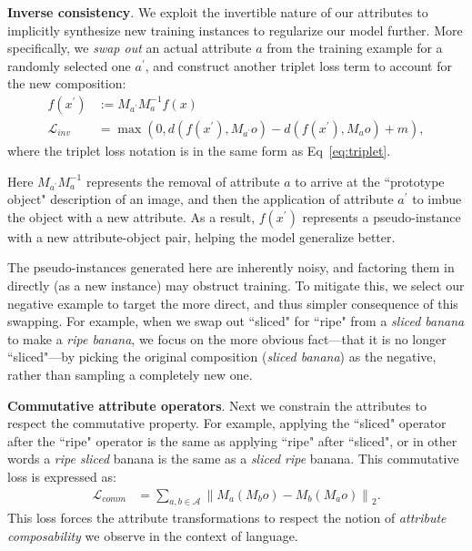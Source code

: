 \documentclass[runningheads]{llncs}
\begin{document}
\vspace{0.05in}
\noindent\textbf{Inverse consistency}.
We exploit the invertible nature of our attributes to implicitly synthesize new training instances to regularize our model further. More specifically, we \emph{swap out} an actual attribute $a$ from the training example for a randomly selected one $a^\prime$, and construct another triplet loss term to account for the new composition:
\begin{equation}
\begin{split}
f(x^\prime) & := M_{a^\prime}M_a^{-1}f(x) \\
\mathcal{L}_{inv} &= \max\left ( 0, d(f(x^\prime), M_{a^\prime}o) - d(f(x^\prime), M_{a}o) + m\right ),
\end{split}
\end{equation}
where the triplet loss notation is in the same form as Eq~\ref{eq:triplet}.

Here $M_{a^\prime}M_a^{-1}$ represents the removal of attribute $a$ to arrive at the ``prototype object" description of an image, and then the application of attribute $a^\prime$ to imbue the object with a new attribute. As a result, $f(x^\prime)$ represents a pseudo-instance with a new attribute-object pair, helping the model generalize better. 

The pseudo-instances generated here are inherently noisy, and factoring them in directly (as a new instance) may obstruct training. To mitigate this, we select our negative example to target the more direct, and thus simpler consequence of this swapping. For example, when we swap out ``sliced" for ``ripe" from a \emph{sliced banana} to make a \emph{ripe banana}, we focus on the more obvious fact---that it is no longer ``sliced"---by picking the original composition (\emph{sliced banana}) as the negative, rather than sampling a completely new one.

\vspace{0.05in}
\noindent\textbf{Commutative attribute operators}. 
Next we constrain the attributes to respect the commutative property.  For example,  applying the ``sliced" operator after the ``ripe" operator is the same as applying ``ripe" after ``sliced", or in other words a \emph{ripe sliced} banana is the same as a \emph{sliced ripe} banana.  This commutative loss is expressed as: 
\begin{align}
\mathcal{L}_{comm} &= \sum_{a, b \in \mathcal{A}} \left \| M_a(M_bo) - M_b(M_ao) \right \|_2.
\end{align}
This loss forces the attribute transformations to respect the notion of \emph{attribute composability} we observe in the context of language.
\end{document}
